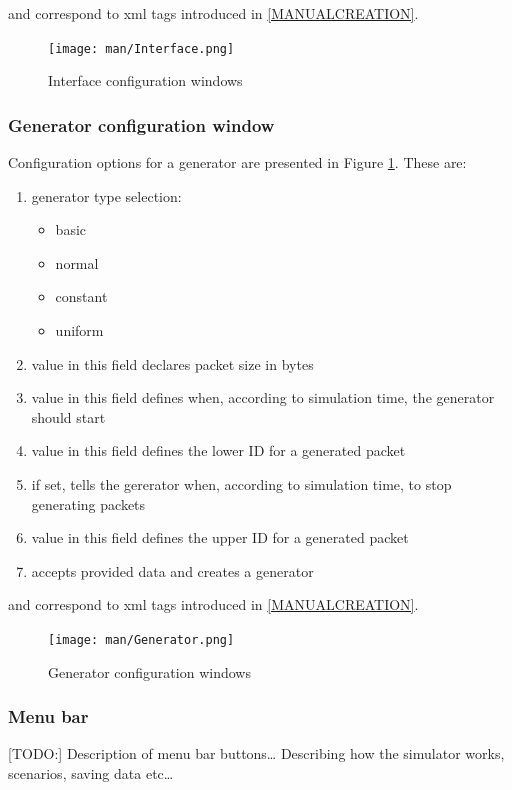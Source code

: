 \documentclass[a4paper,12pt]{article}
\begin{document}
    and correspond to xml tags introduced in \ref{MANUALCREATION}.
	
		\begin{figure}[cht]
			\begin{center}
			\texttt{[image: man/Interface.png]}
			\caption{Interface configuration windows}
			\label{INTERFACE}
			\end{center}
		\end{figure}
	
	\subsubsection{Generator configuration window}
	
	Configuration options for a generator are presented in Figure \ref{INTERFACE}.
	These are:
	
		\begin{enumerate}
		\item {generator type selection:}
			\begin{itemize}
              \item {basic}
              \item {normal}
              \item {constant}
              \item {uniform}
            \end{itemize}
		\item {value in this field declares packet size in bytes }
		\item {value in this field defines when, according to simulation time, the
		generator should start}
		\item {value in this field defines the lower ID for a generated packet }
		\item {if set, tells the gererator when, according to simulation time, to
		stop generating packets }
		\item {value in this field defines the upper ID for a generated packet }
		\item {accepts provided data and creates a generator}
        \end{enumerate} 
        
    and correspond to xml tags introduced in \ref{MANUALCREATION}.
		\begin{figure}[ht]
			\begin{center}
			\texttt{[image: man/Generator.png]}
			\caption{Generator configuration windows}
			\label{GENERATOR}
			\end{center}
		\end{figure}

	\subsubsection{Menu bar}
	
	[TODO:]
	Description of menu bar buttons\ldots
	Describing how the simulator works, scenarios,	saving data etc\ldots




	\newpage
\end{document}
